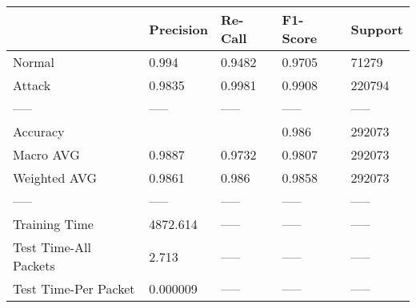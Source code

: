 \begin{tabular}{lllll}
\toprule
{} & Precision & Re-Call & F1-Score & Support \\
\midrule
Normal                &     0.994 &  0.9482 &   0.9705 &   71279 \\
Attack                &    0.9835 &  0.9981 &   0.9908 &  220794 \\
-----                 &     ----- &   ----- &    ----- &   ----- \\
Accuracy              &           &         &    0.986 &  292073 \\
Macro AVG             &    0.9887 &  0.9732 &   0.9807 &  292073 \\
Weighted AVG          &    0.9861 &   0.986 &   0.9858 &  292073 \\
-----                 &     ----- &   ----- &    ----- &   ----- \\
Training Time         &  4872.614 &   ----- &    ----- &   ----- \\
Test Time-All Packets &     2.713 &   ----- &    ----- &   ----- \\
Test Time-Per Packet  &  0.000009 &   ----- &    ----- &   ----- \\
\bottomrule
\end{tabular}
